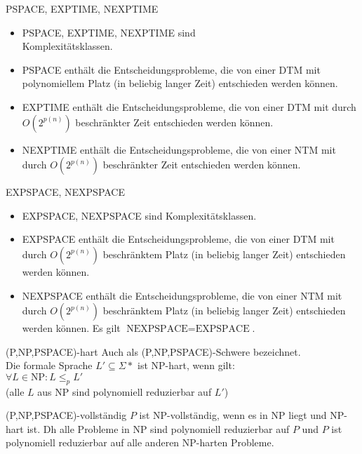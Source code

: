 \documentclass[a7paper,print,grid=both]{kartei}
\begin{document}
\begin{karte}{PSPACE, EXPTIME, NEXPTIME}
\begin{itemize}
    \setlength{\itemindent}{-0.5cm}
    \setlength{\itemsep}{-0.1cm}
    \item PSPACE, EXPTIME, NEXPTIME sind\\Komplexitätsklassen.
    \item PSPACE enthält die Entscheidungsprobleme, die von einer DTM mit polynomiellem Platz (in beliebig langer Zeit) entschieden werden können.
    \item EXPTIME enthält die Entscheidungsprobleme, die von einer DTM mit durch $O(2^{p(n)})$ beschränkter Zeit entschieden werden können.
    \item NEXPTIME enthält die Entscheidungsprobleme, die von einer NTM mit durch $O(2^{p(n)})$ beschränkter Zeit entschieden werden können.
\end{itemize}
\end{karte}
\begin{karte}{EXPSPACE, NEXPSPACE}
\begin{itemize}
    \setlength{\itemindent}{-0.5cm}
    \setlength{\itemsep}{-0.1cm}
    \item EXPSPACE, NEXPSPACE sind Komplexitätsklassen.
    \item EXPSPACE enthält die Entscheidungsprobleme, die von einer DTM mit durch $O(2^{p(n)})$ beschränktem Platz (in beliebig langer Zeit) entschieden werden können.
    \item NEXPSPACE enthält die Entscheidungsprobleme, die von einer NTM mit durch $O(2^{p(n)})$ beschränktem Platz (in beliebig langer Zeit) entschieden werden können. Es gilt $\textrm{NEXPSPACE} = \textrm{EXPSPACE}$.
\end{itemize}
\end{karte}
\begin{karte}{(P,NP,PSPACE)-hart}
Auch als (P,NP,PSPACE)-Schwere bezeichnet.\\
Die formale Sprache $L' \subseteq \Sigma*$ ist NP-hart, wenn gilt:\\
$\forall L \in \textrm{NP}: L \leq_p L'$\\
(alle $L$ aus NP sind polynomiell reduzierbar auf $L'$)
\end{karte}
\begin{karte}{(P,NP,PSPACE)-vollständig}
$P$ ist NP-vollständig, wenn es in NP liegt und NP-hart ist. Dh alle Probleme in NP sind polynomiell reduzierbar auf $P$ und $P$ ist polynomiell reduzierbar auf alle anderen NP-harten Probleme.
\end{karte}
\end{document}
